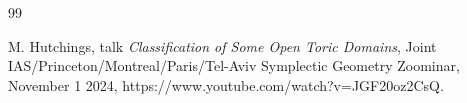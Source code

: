 \documentclass[12pt]{amsart}
\theoremstyle{definition}
\begin{document}
\begin{thebibliography} {99}







 M. Hutchings, talk {\em Classification of Some Open Toric Domains},  Joint IAS/Princeton/Montreal/Paris/Tel-Aviv Symplectic Geometry Zoominar, November 1 2024, https://www.youtube.com/watch?v=JGF20oz2CsQ.






\end{thebibliography}
\end{document}
